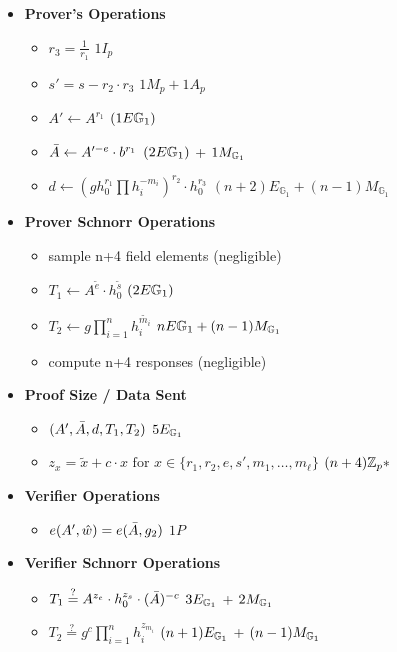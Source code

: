 {\begin{itemize}
    \item \textbf{Prover's Operations}
        \begin{itemize}
            \item $r_3 = \frac{1}{r_1}$ \qquad $1I_p$
            \item $s' = s - r_2 \cdot r_3$ \qquad $1M_p + 1A_p$
            \item $A' \gets A^{r_1}$ \qquad $(1E\mathbb{G}_1)$
            \item $\Bar{A} \gets A'^{-e} \cdot b^{r_1}$ \qquad   $(2E\mathbb{G}_1)$ + $1M_{\mathbb{G}_1}$
            \item $d \leftarrow (gh_0^{r_1}\prod h_i^{-m_i})^{r_2} \cdot h_0^{r_3}$ \qquad $(n+2)E_{\mathbb{G}_1} + (n-1)M_{\mathbb{G}_1}$
        \end{itemize}
    \item \textbf{Prover Schnorr Operations}
        \begin{itemize}
            \item sample n+4 field elements (negligible)
            \item $T_1 \gets A^{\tilde{e}} \cdot h_0^{\tilde{s}}$ \qquad $(2E\mathbb{G}_1)$
            \item $T_2 \gets g\prod_{i=1}^n h_i^{\tilde{m_i}}$ \qquad  $nE\mathbb{G}_1 + (n-1)M_{\mathbb{G}_1}$
            \item compute n+4 responses (negligible)
        \end{itemize}
    \item \textbf{Proof Size / Data Sent}
        \begin{itemize}
            \item $(A', \Bar{A}, d, T_1, T_2)$ \qquad $5E_{\mathbb{G}_1}$
            \item $z_x = \tilde{x} + c \cdot x \text{ for } x \in \{r_1, r_2, e, s', m_1, \ldots, m_{\ell}\}$ \qquad $(n + 4)\mathbb{Z}_p*$
        \end{itemize}
    \item \textbf{Verifier Operations}
    \begin{itemize}
        \item $e(A',\hat{w}) = e(\Bar{A},g_2)$ \qquad $1P$
    \end{itemize}
    \item \textbf{Verifier Schnorr Operations}
    \begin{itemize}
        \item $T_1 \stackrel{?}{=} A^{z_e} \cdot h_0^{z_s} \cdot (\Bar{A})^{-c}$ \qquad $3E_{\mathbb{G}_1}$ + $2M_{\mathbb{G}_1}$
        \item $T_2 \stackrel{?}{=} g^c\prod_{i=1}^n h_i^{z_{m_i}}$ \qquad $(n+1)E_{\mathbb{G}_1}$ + $(n-1)M_{\mathbb{G}_1}$
    \end{itemize}
\end{itemize}



}
